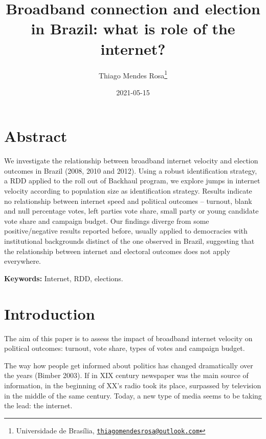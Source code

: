 \documentclass[
  12pt,
]{article}
\title{Broadband connection and election in Brazil: what is role of the
internet?}
\author{Thiago Mendes Rosa\footnote{Universidade de Brasília,
  \href{mailto:thiagomendesrosa@outlook.com}{\nolinkurl{thiagomendesrosa@outlook.com}}}}
\date{2021-05-15}
\begin{document}
\maketitle

\let\oldthebibliography\thebibliography
\let\endoldthebibliography\endthebibliography
\renewenvironment{thebibliography}[1]{
  \begin{oldthebibliography}{#1}
    \setlength{\itemsep}{0em}
    \setlength{\parskip}{0em}
}
{
  \end{oldthebibliography}
}

\allsectionsfont{\centering}

\hypertarget{abstract}{%
\section*{Abstract}\label{abstract}}

We investigate the relationship between broadband internet velocity and
election outcomes in Brazil (2008, 2010 and 2012). Using a robust
identification strategy, a RDD applied to the roll out of Backhaul
program, we explore jumps in internet velocity according to population
size as identification strategy. Results indicate no relationship
between internet speed and political outcomes -- turnout, blank and null
percentage votes, left parties vote share, small party or young
candidate vote share and campaign budget. Our findings diverge from some
positive/negative results reported before, usually applied to
democracies with institutional backgrounds distinct of the one observed
in Brazil, suggesting that the relationship between internet and
electoral outcomes does not apply everywhere.

\textbf{Keywords:} Internet, RDD, elections.

\allsectionsfont{\raggedright}

\clearpage

\hypertarget{introduction}{%
\section*{Introduction}\label{introduction}}

The aim of this paper is to assess the impact of broadband internet
velocity on political outcomes: turnout, vote share, types of votes and
campaign budget.

The way how people get informed about politics has changed dramatically
over the years (Bimber 2003). If in XIX century newspaper was the main
source of information, in the beginning of XX's radio took its place,
surpassed by television in the middle of the same century. Today, a new
type of media seems to be taking the lead: the internet.
\end{document}
